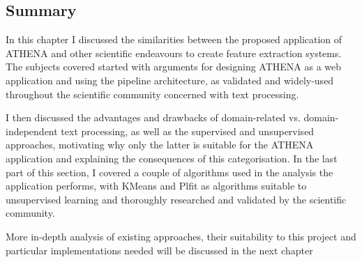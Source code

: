 \subsection*{Summary}
In this chapter I discussed the similarities between the proposed application of ATHENA and other scientific endeavours to create feature extraction systems. The subjects covered started with arguments for designing ATHENA as a web application and using the pipeline architecture, as validated and widely-used throughout the scientific community concerned with text processing.

I then discussed the advantages and drawbacks of domain-related vs. domain-independent text processing, as well as the supervised and unsupervised approaches, motivating why only the latter is suitable for the ATHENA application and explaining the consequences of this categorisation. In the last part of this section, I covered a couple of algorithms used in the analysis the application performs, with KMeans and Plfit as algorithms suitable to unsupervised learning and thoroughly researched and validated by the scientific community.

More in-depth analysis of existing approaches, their suitability to this project and particular implementations needed will be discussed in the next chapter